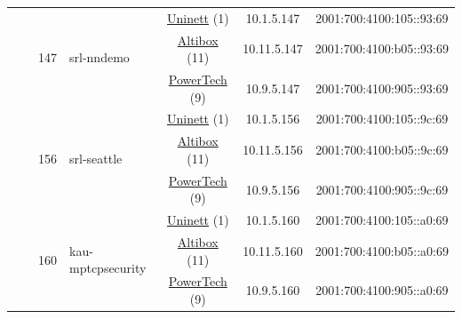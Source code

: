 \begin{small}
\begin{center}
\begin{longtable}{|c|c|c|c|c|c|c|c|}
  &  & \multirow{3}{*}{\tiny{147}} & \multicolumn{1}{|l|}{\multirow{3}{*}{\tiny{srl-nndemo}}} & \multicolumn{2}{|c|}{\tiny{\href{https://www.uninett.no}{Uninett} (1)}} & \tiny{10.1.5.147} & \tiny{2001:700:4100:105::93:69} \\* \cline{5-5}\cline{6-6}\cline{7-7}\cline{8-8}
  &  &  &  & \multicolumn{2}{|c|}{\tiny{\href{https://www.altibox.no}{Altibox} (11)}} & \tiny{10.11.5.147} & \tiny{2001:700:4100:b05::93:69} \\* \cline{5-5}\cline{6-6}\cline{7-7}\cline{8-8}
  &  &  &  & \multicolumn{2}{|c|}{\tiny{\href{http://www.powertech.no}{PowerTech} (9)}} & \tiny{10.9.5.147} & \tiny{2001:700:4100:905::93:69} \\* \cline{3-3}\cline{4-4}\cline{5-5}\cline{6-6}\cline{7-7}\cline{8-8}
  &  & \multirow{3}{*}{\tiny{156}} & \multicolumn{1}{|l|}{\multirow{3}{*}{\tiny{srl-seattle}}} & \multicolumn{2}{|c|}{\tiny{\href{https://www.uninett.no}{Uninett} (1)}} & \tiny{10.1.5.156} & \tiny{2001:700:4100:105::9c:69} \\* \cline{5-5}\cline{6-6}\cline{7-7}\cline{8-8}
  &  &  &  & \multicolumn{2}{|c|}{\tiny{\href{https://www.altibox.no}{Altibox} (11)}} & \tiny{10.11.5.156} & \tiny{2001:700:4100:b05::9c:69} \\* \cline{5-5}\cline{6-6}\cline{7-7}\cline{8-8}
  &  &  &  & \multicolumn{2}{|c|}{\tiny{\href{http://www.powertech.no}{PowerTech} (9)}} & \tiny{10.9.5.156} & \tiny{2001:700:4100:905::9c:69} \\* \cline{3-3}\cline{4-4}\cline{5-5}\cline{6-6}\cline{7-7}\cline{8-8}
  &  & \multirow{3}{*}{\tiny{160}} & \multicolumn{1}{|l|}{\multirow{3}{*}{\tiny{kau-mptcpsecurity}}} & \multicolumn{2}{|c|}{\tiny{\href{https://www.uninett.no}{Uninett} (1)}} & \tiny{10.1.5.160} & \tiny{2001:700:4100:105::a0:69} \\* \cline{5-5}\cline{6-6}\cline{7-7}\cline{8-8}
  &  &  &  & \multicolumn{2}{|c|}{\tiny{\href{https://www.altibox.no}{Altibox} (11)}} & \tiny{10.11.5.160} & \tiny{2001:700:4100:b05::a0:69} \\* \cline{5-5}\cline{6-6}\cline{7-7}\cline{8-8}
  &  &  &  & \multicolumn{2}{|c|}{\tiny{\href{http://www.powertech.no}{PowerTech} (9)}} & \tiny{10.9.5.160} & \tiny{2001:700:4100:905::a0:69} \\ \hline
\end{longtable}
\end{center}
\end{small}



